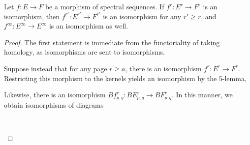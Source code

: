 \documentclass[../thesis.tex]{subfiles}
\begin{document}
        \begin{lemma}
            Let $f: E \rightarrow F$ be a morphism of spectral sequences. If $f^r : E^r \rightarrow F^r$ is an isomorphism, then $f^{r'} : E^{r'} \rightarrow F^{r'}$ is an isomorphism for any $r' \geq r$, and $f^\infty : E^\infty \rightarrow E^\infty$ is an isomorphism as well.
        \end{lemma}

        \begin{proof}
            The first statement is immediate from the functoriality of taking homology, as isomorphisms are sent to isomorphisms. 
            
            Suppose instead that for any page $r \geq a$, there is an isomorphism $f^r: E^r \rightarrow F^r$. Restricting this morphism to the kernels yields an isomorphism by the 5-lemma,
            \begin{center}
            \end{center}
            Likewise, there is an isomorphism $Bf^r_{p,q} : BE^r_{p,q} \rightarrow BF^r_{p,q}$. In this manner, we obtain isomorphisms of diagrams
            \begin{center}
                \\

\end{center}
\end{proof}
\end{document}
